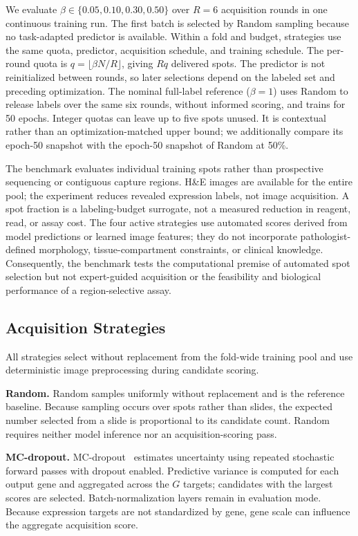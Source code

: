 \documentclass[]{spie}
\begin{document}
We evaluate $\beta\in\{0.05,0.10,0.30,0.50\}$ over $R=6$ acquisition rounds in one continuous training run. The first batch is selected by Random sampling because no task-adapted predictor is available. Within a fold and budget, strategies use the same quota, predictor, acquisition schedule, and training schedule. The per-round quota is $q=\lfloor\beta N/R\rfloor$, giving $Rq$ delivered spots. The predictor is not reinitialized between rounds, so later selections depend on the labeled set and preceding optimization. The nominal full-label reference ($\beta=1$) uses Random to release labels over the same six rounds, without informed scoring, and trains for 50 epochs. Integer quotas can leave up to five spots unused. It is contextual rather than an optimization-matched upper bound; we additionally compare its epoch-50 snapshot with the epoch-50 snapshot of Random at 50\%.

The benchmark evaluates individual training spots rather than prospective sequencing or contiguous capture regions. H\&E images are available for the entire pool; the experiment reduces revealed expression labels, not image acquisition. A spot fraction is a labeling-budget surrogate, not a measured reduction in reagent, read, or assay cost. The four active strategies use automated scores derived from model predictions or learned image features; they do not incorporate pathologist-defined morphology, tissue-compartment constraints, or clinical knowledge. Consequently, the benchmark tests the computational premise of automated spot selection but not expert-guided acquisition or the feasibility and biological performance of a region-selective assay.

\subsection{Acquisition Strategies}
\label{sec:strategies}

All strategies select without replacement from the fold-wide training pool and use deterministic image preprocessing during candidate scoring.

\noindent\textbf{Random.}
Random samples uniformly without replacement and is the reference baseline. Because sampling occurs over spots rather than slides, the expected number selected from a slide is proportional to its candidate count. Random requires neither model inference nor an acquisition-scoring pass.

\noindent\textbf{MC-dropout.}
MC-dropout~\cite{gal2016dropout,gal2017deep} estimates uncertainty using repeated stochastic forward passes with dropout enabled. Predictive variance is computed for each output gene and aggregated across the $G$ targets; candidates with the largest scores are selected. Batch-normalization layers remain in evaluation mode. Because expression targets are not standardized by gene, gene scale can influence the aggregate acquisition score.
\end{document}
